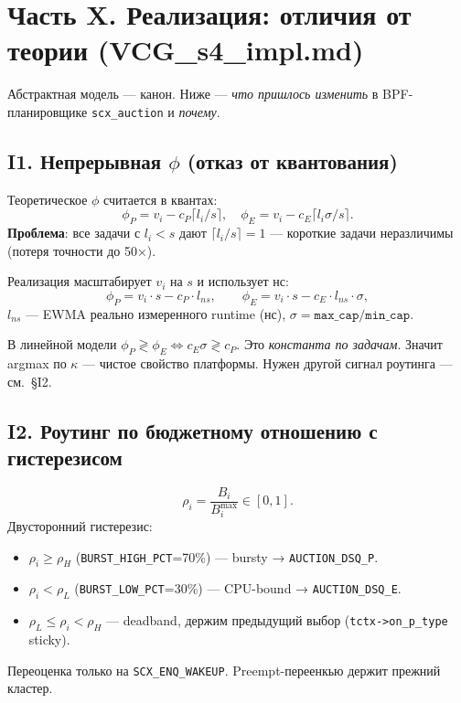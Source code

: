 \documentclass[11pt,a4paper]{article}
\begin{document}
\clearpage
\section{Часть X. Реализация: отличия от теории (VCG\_s4\_impl.md)}

Абстрактная модель — канон. Ниже — \emph{что пришлось изменить} в
BPF-планировщике \texttt{scx\_auction} и \emph{почему}.

\subsection{I1. Непрерывная $\phi$ (отказ от квантования)}

Теоретическое $\phi$ считается в квантах:
\[
\phi_P=v_i-c_P\lceil l_i/s\rceil,\quad
\phi_E=v_i-c_E\lceil l_i\sigma/s\rceil.
\]
\textbf{Проблема}: все задачи с $l_i<s$ дают $\lceil l_i/s\rceil=1$ —
короткие задачи неразличимы (потеря точности до 50×).

Реализация масштабирует $v_i$ на $s$ и использует нс:
\[
\boxed{\phi_P = v_i\cdot s - c_P\cdot l_{ns},\qquad
\phi_E = v_i\cdot s - c_E\cdot l_{ns}\cdot\sigma,}
\]
$l_{ns}$ — EWMA реально измеренного runtime (нс),
$\sigma=\mathtt{max\_cap}/\mathtt{min\_cap}$.

\begin{why}
В линейной модели $\phi_P\gtrless\phi_E \iff c_E\sigma\gtrless c_P$.
Это \emph{константа по задачам}. Значит argmax по $\kappa$ — чистое
свойство платформы. Нужен другой сигнал роутинга — см.\ §I2.
\end{why}

\subsection{I2. Роутинг по бюджетному отношению с гистерезисом}

\[
\rho_i = \frac{B_i}{B_i^{\max}}\in[0,1].
\]
Двусторонний гистерезис:
\begin{itemize}
  \item $\rho_i\geq \rho_H$ (\texttt{BURST\_HIGH\_PCT}=70\%) — bursty → \texttt{AUCTION\_DSQ\_P}.
  \item $\rho_i<\rho_L$ (\texttt{BURST\_LOW\_PCT}=30\%) — CPU-bound → \texttt{AUCTION\_DSQ\_E}.
  \item $\rho_L\leq\rho_i<\rho_H$ — deadband, держим предыдущий выбор (\texttt{tctx->on\_p\_type} sticky).
\end{itemize}
Переоценка только на \texttt{SCX\_ENQ\_WAKEUP}. Preempt-переенкью
держит прежний кластер.
\end{document}
